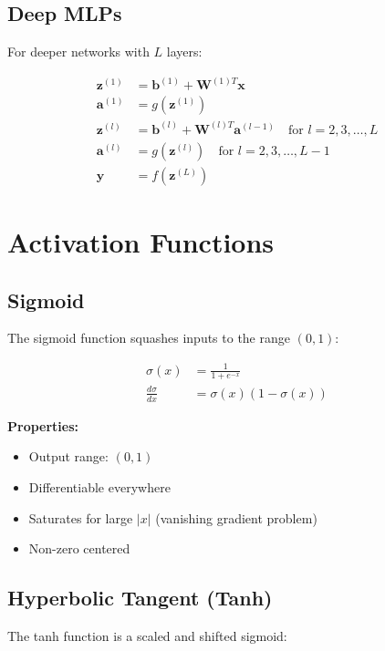 \documentclass{article}
\begin{document}
\subsection{Deep MLPs}

For deeper networks with $L$ layers:

\begin{align}
\boldsymbol{z}^{(1)} &= \boldsymbol{b}^{(1)} + \boldsymbol{W}^{(1)T}\boldsymbol{x} \\
\boldsymbol{a}^{(1)} &= g(\boldsymbol{z}^{(1)}) \\
\boldsymbol{z}^{(l)} &= \boldsymbol{b}^{(l)} + \boldsymbol{W}^{(l)T}\boldsymbol{a}^{(l-1)} \quad \text{for } l = 2, 3, \ldots, L\\
\boldsymbol{a}^{(l)} &= g(\boldsymbol{z}^{(l)}) \quad \text{for } l = 2, 3, \ldots, L-1\\
\hat{\boldsymbol{y}} &= f(\boldsymbol{z}^{(L)})
\end{align}

\section{Activation Functions}

\subsection{Sigmoid}

The sigmoid function squashes inputs to the range $(0, 1)$:

\begin{align}
\sigma(x) &= \frac{1}{1 + e^{-x}} \\
\frac{d\sigma}{dx} &= \sigma(x)(1 - \sigma(x))
\end{align}

\textbf{Properties:}
\begin{itemize}
    \item Output range: $(0, 1)$
    \item Differentiable everywhere
    \item Saturates for large $|x|$ (vanishing gradient problem)
    \item Non-zero centered
\end{itemize}

\subsection{Hyperbolic Tangent (Tanh)}

The tanh function is a scaled and shifted sigmoid:
\end{document}

